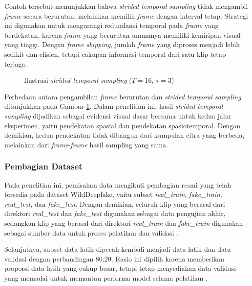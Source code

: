 Contoh tersebut menunjukkan bahwa \textit{strided temporal sampling} tidak mengambil \textit{frame} secara berurutan, melainkan memilih \textit{frame} dengan interval tetap. Strategi ini digunakan untuk mengurangi redundansi temporal pada \textit{frame} yang berdekatan, karena \textit{frame} yang berurutan umumnya memiliki kemiripan visual yang tinggi. Dengan \textit{frame skipping}, jumlah \textit{frame} yang diproses menjadi lebih sedikit dan efisien, tetapi cakupan informasi temporal dari satu klip tetap terjaga. \par

\begin{figure}[H]
	\centering
	\caption{Ilustrasi \textit{strided temporal sampling} ($T = 16$, $\tau = 3$)}
	\label{fig:3.strided-temporal-sampling}
\end{figure}

Perbedaan antara pengambilan \textit{frame} berurutan dan \textit{strided temporal sampling} ditunjukkan pada Gambar \ref{fig:3.strided-temporal-sampling}. Dalam penelitian ini, hasil \textit{strided temporal sampling} dijadikan sebagai evidensi visual dasar bersama untuk kedua jalur eksperimen, yaitu pendekatan spasial dan pendekatan spasiotemporal. Dengan demikian, kedua pendekatan tidak dibangun dari kumpulan citra yang berbeda, melainkan dari \textit{frame}-\textit{frame} hasil sampling yang sama.\par

\subsubsection{Pembagian Dataset}
Pada penelitian ini, pemisahan data mengikuti pembagian resmi yang telah tersedia pada dataset WildDeepfake, yaitu subset \textit{real\_train}, \textit{fake\_train}, \textit{real\_test}, dan \textit{fake\_test}. Dengan demikian, seluruh klip yang berasal dari direktori \textit{real\_test} dan \textit{fake\_test} digunakan sebagai data pengujian akhir, sedangkan klip yang berasal dari direktori \textit{real\_train} dan \textit{fake\_train} digunakan sebagai sumber data untuk proses pelatihan dan validasi \cite{Zi2024}. \par

Selanjutnya, subset data latih dipecah kembali menjadi data latih dan data validasi dengan perbandingan 80:20. Rasio ini dipilih karena memberikan proporsi data latih yang cukup besar, tetapi tetap menyediakan data validasi yang memadai untuk memantau performa model selama pelatihan \cite{joseph2022optimalratio}\cite{bichri2024traintestsplitratio}. \par

